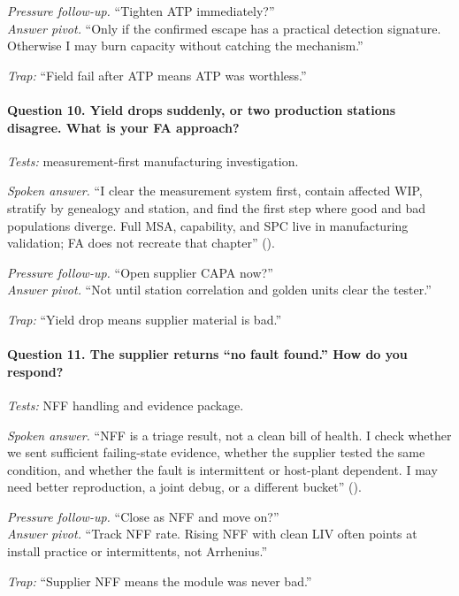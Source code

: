 \textit{Pressure follow-up.} ``Tighten ATP immediately?''\\
\textit{Answer pivot.} ``Only if the confirmed escape has a practical detection
signature. Otherwise I may burn capacity without catching the mechanism.''

\textit{Trap:} ``Field fail after ATP means ATP was worthless.''

\paragraph{Question 10. Yield drops suddenly, or two production stations
disagree. What is your FA approach?}
\textit{Tests:} measurement-first manufacturing investigation.

\textit{Spoken answer.}
``I clear the measurement system first, contain affected WIP, stratify by
genealogy and station, and find the first step where good and bad populations
diverge. Full MSA, capability, and SPC live in manufacturing validation; FA does
not recreate that chapter'' ().

\textit{Pressure follow-up.} ``Open supplier CAPA now?''\\
\textit{Answer pivot.} ``Not until station correlation and golden units clear
the tester.''

\textit{Trap:} ``Yield drop means supplier material is bad.''

\paragraph{Question 11. The supplier returns ``no fault found.'' How do you
respond?}
\textit{Tests:} NFF handling and evidence package.

\textit{Spoken answer.}
``NFF is a triage result, not a clean bill of health. I check whether we sent
sufficient failing-state evidence, whether the supplier tested the same
condition, and whether the fault is intermittent or host-plant dependent. I may
need better reproduction, a joint debug, or a different bucket''
().

\textit{Pressure follow-up.} ``Close as NFF and move on?''\\
\textit{Answer pivot.} ``Track NFF rate. Rising NFF with clean LIV often points
at install practice or intermittents, not Arrhenius.''

\textit{Trap:} ``Supplier NFF means the module was never bad.''

